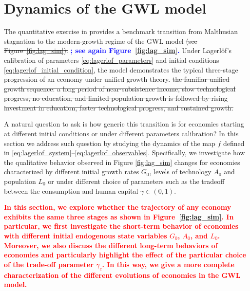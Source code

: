 \documentclass[a4paper,fleqn]{cas-sc}
\newcommand{\samd}[1]{\textcolor{red}{\textbf{#1}}}
\newcommand{\samb}[1]{\textcolor{blue}{\textbf{#1}}}
\begin{document}
\section{Dynamics of the GWL model}\label{sec:analysis}
The quantitative exercise in \citet{Lagerlof2006} provides a benchmark transition from Malthusian stagnation to the modern-growth regime of the GWL model \sout{(see Figure~\ref{fig:lag_sim}). }\samb{; see again Figure~\ref{fig:lag_sim}.}
Under Lagerl\"{o}f's calibration of parameters \eqref{eq:lagerlof_parameters} and initial conditions \eqref{eq:lagerlof_initial_condition}, the model demonstrates the typical three-stage progression of an economy under unified growth theory. \sout{the familiar unified growth sequence: a long period of near-subsistence income, slow technological progress, no education, and limited population growth is followed by rising investment in education, faster technological progress, and sustained growth.}

A natural question to ask is how generic this transition is for economies starting at different initial conditions or under different parameters calibration?
In this section we address such question by studying the dynamics of the map $f$ defined in \eqref{eq:lagerlof_system}--\eqref{eq:lagerlof_observables}. 
Specifically, we investigate how the qualitative behavior observed in Figure \ref{fig:lag_sim} changes for economies characterized by different initial growth rates $G_0$, levels of technology $A_0$ and population $L_0$ or under different choice of parameters such as the tradeoff between the consumption and human capital $\gamma\in(0,1)$.

\samd{In this section, we explore whether the trajectory of any economy exhibits the same three stages as shown in Figure~\ref{fig:lag_sim}. In particular, we first investigate the short-term behavior of economies with different initial endogenous state variables $G_0$, $A_0$, and $L_0$. Moreover, we also discuss the different long-term behaviors of economies and particularly highlight the effect of the particular choice of the trade-off parameter $\gamma_c$. In this way, we give a more complete characterization of the different evolutions of economies in the GWL model. }
\end{document}
